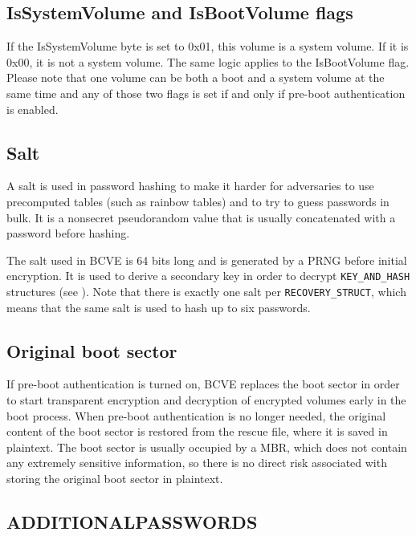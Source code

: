 \documentclass[thesis=B,english]{FITthesis}[2012/10/20]
\begin{document}
	\subsection{IsSystemVolume and IsBootVolume flags}
	
	If the IsSystemVolume byte is set to 0x01, this volume is a system volume. If it is 0x00, it is not a system volume. The same logic applies to the IsBootVolume flag. Please note that one volume can be both a boot and a system volume at the same time \cite{system_boot} and any of those two flags is set if and only if pre-boot authentication is enabled. 
	
	\subsection{Salt}
	
	A salt is used in password hashing to make it harder for adversaries to use precomputed tables (such as rainbow tables) and to try to guess passwords in bulk. It is a nonsecret pseudorandom value that is usually concatenated with a password before hashing.
	
	The salt used in BCVE is 64 bits long and is generated by a PRNG before initial encryption. It is used to derive a secondary key in order to decrypt \verb|KEY_AND_HASH| structures (see ). Note that there is exactly one salt per \verb|RECOVERY_STRUCT|, which means that the same salt is used to hash up to six passwords.
	
	\subsection{Original boot sector}
	
	If pre-boot authentication is turned on, BCVE replaces the boot sector in order to start transparent encryption and decryption of encrypted volumes early in the boot process. When pre-boot authentication is no longer needed, the original content of the boot sector is restored from the rescue file, where it is saved in plaintext. The boot sector is usually occupied by a MBR, which does not contain any extremely sensitive information, so there is no direct risk associated with storing the original boot sector in plaintext.
	
	\subsection{ADDITIONAL\textunderscore{}PASSWORDS}
	
\end{document}
